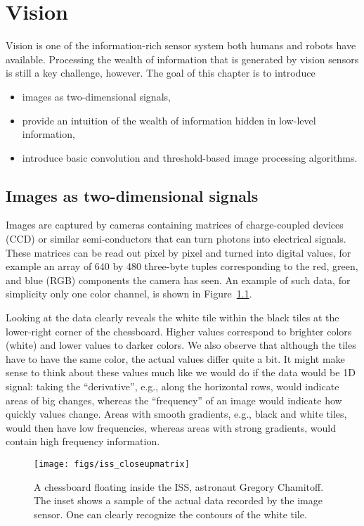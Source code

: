 \chapter{Vision}\label{chap:vision}
Vision is one of the information-rich sensor system both humans and robots have available. Processing the wealth of information that is generated by vision sensors is still a key challenge, however. The goal of this chapter is to introduce
\begin{itemize}
\item images as two-dimensional signals,
\item provide an intuition of the wealth of information hidden in low-level information,
\item introduce basic convolution and threshold-based image processing algorithms.
\end{itemize}

\section{Images as two-dimensional signals}
Images are captured by cameras containing matrices of charge-coupled devices (CCD) or similar semi-conductors that can turn photons into electrical signals. These matrices can be read out pixel by pixel and turned into digital values, for example an array of 640 by 480 three-byte tuples corresponding to the red, green, and blue (RGB) components the camera has seen. An example of such data, for simplicity only one color channel, is shown in Figure~\ref{fig:iss_closeup}.

Looking at the data clearly reveals the white tile within the black tiles at the lower-right corner of the chessboard. Higher values correspond to brighter colors (white) and lower values to darker colors. We also observe that although the tiles have to have the same color, the actual values differ quite a bit. It might make sense to think about these values much like we would do if the data would be 1D signal: taking the ``derivative'', e.g., along the horizontal rows, would indicate areas of big changes, whereas the ``frequency'' of an image  would indicate how quickly values change. Areas with smooth gradients, e.g., black and white tiles, would then have low frequencies, whereas areas with strong gradients, would contain high frequency information.

\begin{figure}[!htb]
    \centering
    \texttt{[image: figs/iss\_closeupmatrix]}
    \caption{A chessboard floating inside the ISS, astronaut Gregory Chamitoff. The inset shows a sample of the actual data recorded by the image sensor. One can clearly recognize the contours of the white tile.}
    \label{fig:iss_closeup}
\end{figure}

